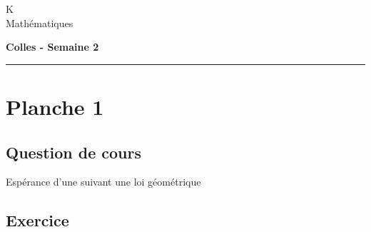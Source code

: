 \documentclass[11pt]{article}%
\begin{document}
\begin{flushleft}
K \\
Mathématiques
\end{flushleft}

\begin{center}
\textbf{\Large{Colles - Semaine 2}}
\end{center}

\hrule

\vspace*{0,2cm}

\section*{Planche 1}
\subsection*{Question de cours}

\noindent
Espérance d'une \var suivant une loi géométrique


\subsection*{Exercice} %
\end{document}
